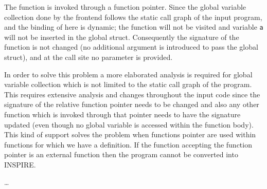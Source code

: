The function  is invoked through a function pointer. Since the
global variable collection done by the frontend follows the static call graph of the
input program, and the binding of  here is dynamic; the function will not
be visited and variable {\tt a} will not be inserted in the global struct.
Consequently the signature of the function  is not changed (no additional
argument is introduced to pass the global struct), and at the call site no
parameter is provided. 

In order to solve this problem a more elaborated analysis is required for global
variable collection which is not limited to the static call graph of the
program. This requires extensive analysis and changes throughout the input code
since the signature of the relative function pointer needs to be changed and
also any other function which is invoked through that pointer needs to have the
signature updated (even though no global variable is accessed within the
function body). This kind of support solves the problem when functions pointer
are used within functions for which we have a definition. If the function
accepting the function pointer is an external function then the program cannot
be converted into INSPIRE. 

\ldots
